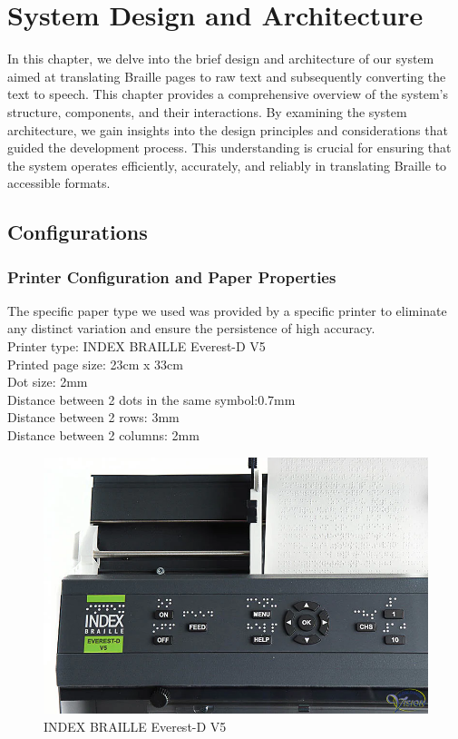 \section{System Design and Architecture}
\setcounter{figure}{0}
\renewcommand{\thefigure}{3.\arabic{figure}}
In this chapter, we delve into the brief design and architecture of our system aimed at translating Braille pages to raw text and subsequently converting the text to speech. This chapter provides a comprehensive overview of the system's structure, components, and their interactions. By examining the system architecture, we gain insights into the design principles and considerations that guided the development process. This understanding is crucial for ensuring that the system operates efficiently, accurately, and reliably in translating Braille to accessible formats.




\subsection{Configurations}
\subsubsection{Printer Configuration and Paper Properties}
The specific paper type we used was provided by a specific printer to eliminate any distinct variation and ensure the persistence of high accuracy. 
\noindent \\Printer type: INDEX BRAILLE Everest-D V5\\
Printed page size: 23cm x 33cm\\
Dot size: 2mm\\
Distance between 2 dots in the same symbol:0.7mm\\
Distance between 2 rows: 3mm\\
Distance between 2 columns: 2mm\\
\begin{figure}[!ht]
\centering
\includegraphics[width=0.4\linewidth]{printer.png}
\caption{INDEX BRAILLE Everest-D V5}
\label{fig:INDEX BRAILLE Everest-D V5}
\end{figure} \\

